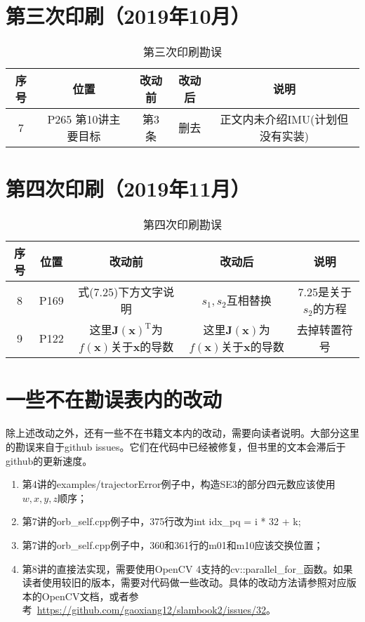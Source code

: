 \documentclass[lang=cn,11pt,numbers]{errata}
\begin{document}
\section{第三次印刷（2019年10月）}
\begin{table}[!htp]
	\centering
	\caption{第三次印刷勘误}
	\begin{tabular}{c|cccc}
		\hline\hline
		序号 & 位置 & 改动前 & 改动后 & 说明 \\\hline
		7 & P265 第10讲主要目标 & 第3条 & 删去 & 正文内未介绍IMU(计划但没有实装) \\
		\hline \hline
	\end{tabular}
\end{table}

\section{第四次印刷（2019年11月）}
\begin{table}[!htp]
	\centering
	\caption{第四次印刷勘误}
	\begin{tabular}{c|cccc}
		\hline\hline
		序号 & 位置 & 改动前 & 改动后 & 说明 \\\hline
		8 & P169  & 式(7.25)下方文字说明 & $s_1,s_2$互相替换 & 7.25是关于$s_2$的方程 \\
		\hline \hline
        9 & P122  & 这里$\bm{J}(\bm{x})^\mathrm{T}$为$f(\bm{x})$关于$\bm{x}$的导数 & 这里$\bm{J}(\bm{x})$为$f(\bm{x})$关于$\bm{x}$的导数 & 去掉转置符号 \\
        \hline \hline
	\end{tabular}
\end{table}

\section{一些不在勘误表内的改动}
除上述改动之外，还有一些不在书籍文本内的改动，需要向读者说明。大部分这里的勘误来自于github issues。它们在代码中已经被修复，但书里的文本会滞后于github的更新速度。

\begin{enumerate}
	\item 第4讲的examples/trajectorError例子中，构造SE3的部分四元数应该使用$w,x,y,z$顺序；
	\item 第7讲的orb\_self.cpp例子中，375行改为int idx\_pq = i * 32 + k;
    \item 第7讲的orb\_self.cpp例子中，360和361行的m01和m10应该交换位置；
	\item 第8讲的直接法实现，需要使用OpenCV 4支持的cv::parallel\_for\_函数。如果读者使用较旧的版本，需要对代码做一些改动。具体的改动方法请参照对应版本的OpenCV文档，或者参考~\url{https://github.com/gaoxiang12/slambook2/issues/32}。

\end{enumerate}
\end{document}
